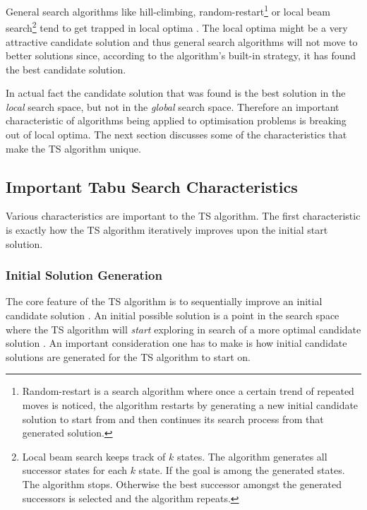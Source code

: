 General search algorithms like hill-climbing, random-restart\footnote{Random-restart is a search algorithm where once a certain trend of repeated moves is noticed, the algorithm restarts by generating a new initial candidate solution to start from and then continues its search process from that generated solution\cite{AIModernApproach}.} or local beam search\footnote{Local beam search keeps track of $k$ states. The algorithm generates all successor states for each $k$ state. If the goal is among the generated states. The algorithm stops. Otherwise the best successor amongst the generated successors is selected and the algorithm repeats\cite{AIModernApproach}.} tend to get trapped in local optima \cite{AIModernApproach}. The local optima might be a very attractive candidate solution and thus general search algorithms will not move to better solutions since, according to the algorithm's built-in strategy, it has found the best candidate solution. 

In actual fact the candidate solution that was found is the best solution in the \emph{local} search space, but not in the \emph{global} search space\cite{CompuIntelligenceIntro,AIModernApproach}. Therefore an important characteristic of algorithms being applied to optimisation problems is breaking out of local optima\cite{CompuIntelligenceIntro,AIModernApproach}.
The next section discusses some of the characteristics that make the \gls{TS} algorithm unique.

\subsection{Important Tabu Search Characteristics}
\label{sec:TScharacteristics}
Various characteristics are important to the \gls{TS} algorithm. The first characteristic is exactly how the \gls{TS} algorithm iteratively improves upon the initial start solution.

\subsubsection{Initial Solution Generation}
The core feature of the \gls{TS} algorithm is to sequentially improve an initial candidate solution \cite{TSHazardous}. An initial possible solution is a point in the search space where the \gls{TS} algorithm will \emph{start} exploring in search of a more optimal candidate solution \cite{AIModernApproach,TSHazardous}.
An important consideration one has to make is how initial candidate solutions are generated for the \gls{TS} algorithm to start on\cite{AIModernApproach,TSHazardous}.


